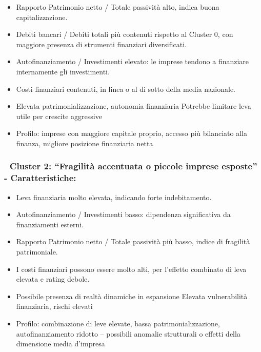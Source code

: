 \documentclass[
  letterpaper,
  DIV=11,
  numbers=noendperiod]{scrartcl}
\providecommand{\tightlist}{%
  \setlength{\itemsep}{0pt}\setlength{\parskip}{0pt}}
\begin{document}
\begin{itemize}
\tightlist
\item
  Rapporto Patrimonio netto / Totale passività alto, indica buona
  capitalizzazione.
\item
  Debiti bancari / Debiti totali più contenuti rispetto al Cluster 0,
  con maggiore presenza di strumenti finanziari diversificati.
\item
  Autofinanziamento / Investimenti elevato: le imprese tendono a
  finanziare internamente gli investimenti.
\item
  Costi finanziari contenuti, in linea o al di sotto della media
  nazionale.
\item
  Elevata patrimonializzazione, autonomia finanziaria Potrebbe limitare
  leva utile per crescite aggressive
\item
  Profilo: imprese con maggiore capitale proprio, accesso più bilanciato
  alla finanza, migliore posizione finanziaria netta
\end{itemize}

\subsubsection{🔴 Cluster 2: ``Fragilità accentuata o piccole imprese
esposte'' -
Caratteristiche:}\label{cluster-2-fragilituxe0-accentuata-o-piccole-imprese-esposte---caratteristiche}

\begin{itemize}
\tightlist
\item
  Leva finanziaria molto elevata, indicando forte indebitamento.
\item
  Autofinanziamento / Investimenti basso: dipendenza significativa da
  finanziamenti esterni.
\item
  Rapporto Patrimonio netto / Totale passività più basso, indice di
  fragilità patrimoniale.
\item
  I costi finanziari possono essere molto alti, per l'effetto combinato
  di leva elevata e rating debole.
\item
  Possibile presenza di realtà dinamiche in espansione Elevata
  vulnerabilità finanziaria, rischi elevati
\item
  Profilo: combinazione di leve elevate, bassa patrimonializzazione,
  autofinanziamento ridotto -- possibili anomalie strutturali o effetti
  della dimensione media d'impresa
\end{itemize}
\end{document}
